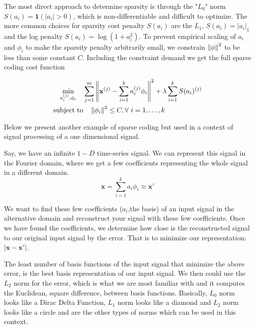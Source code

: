 
The most direct approach to determine sparsity is through the "$L_0$" norm $S(a_i) = \mathbf{1}(|a_i| > 0 )$, which is non-differentiable and difficult to optimize. The more common choices for sparsity cost penalty $S(a_i)$ are the $L_1$, $S(a_i) = |a_i|_1$ and the log penalty $S(a_i)=\log(1+a^2_i)$. To prevent empirical scaling of $a_i$ and $\phi_i$ to make the sparsity penalty arbitrarily small, we constrain $\left\lVert\phi\right\rVert^2$ to be less than some constant $C$. Including the constraint demand we get the full sparse coding cost function \cite{olshausen}

\begin{align}
\begin{split}
\min_{a_i^{(j)},\phi_i} \quad & \sum_{j=1}^m
\left\lVert\mathbf{x}^{(j)}-\sum_{i=1}^ka_i^{(j)}\phi_i\right\rVert^2+\lambda \sum_{i=1}^kS(a_i)^{(j)}
\\
\text{subject to} & \quad \left\lVert\phi_i\right\rVert^2 \leq C, \forall \ i = 1,\dots,k
\end{split}
\end{align}

Below we present another example of sparse coding but used in a context of signal processing of a one dimensional signal.
\begin{ex}{}
\label{ex:sc}
Say, we have an infinite $1-D$ time-series signal. We can represent this signal in the Fourier domain, where we get a few coefficients representing the whole signal in a different domain.
\begin{equation*}
\mathbf{x} = \sum_{i=1}^k a_i \phi_i \approx \mathbf{x}'
\end{equation*}

We want to find these few coefficients ($a_i$,the basis) of an input signal in the alternative domain and reconstruct your signal with these few coefficients. Once we have found the coefficients, we determine how close is the reconstructed signal to our original input signal by the error. That is to minimize our representation: $|\mathbf{x}- \mathbf{x}'|$.

The least number of basis functions of the input signal that minimize the above error, is the best basis representation of our input signal. We then could use the $L_2$ norm for the error, which is what we are most familiar with and it computes the Euclidean, square difference, between basis functions. Basically, $L_0$ norm looks like a Dirac Delta Function, $L_1$ norm looks like a diamond and $L_2$ norm looks like a circle and are the other types of norms which can be used in this context.

\end{ex}

